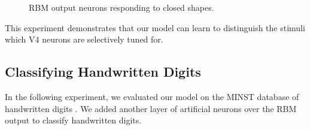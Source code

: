 \documentclass[conference]{IEEEtran}
\begin{document}
\begin{figure}[htp]
\centering
{}\hfil
{}\hfil
{}
\caption{RBM output neurons responding to closed shapes.}
\label{fig:9}
\end{figure}

This experiment demonstrates that our model can learn to distinguish the stimuli
which V4 neurons are selectively tuned for.

\subsection{Classifying Handwritten Digits}

In the following experiment,
we evaluated our model on the MINST database of handwritten digits \cite{lecun1998}.
We added another layer of artificial neurons over the RBM output
to classify handwritten digits.
\end{document}
